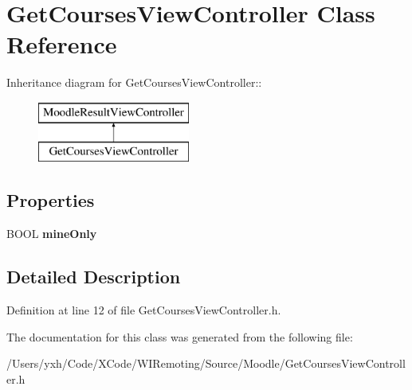 \hypertarget{interface_get_courses_view_controller}{
\section{GetCoursesViewController Class Reference}
\label{interface_get_courses_view_controller}
}
Inheritance diagram for GetCoursesViewController::\begin{figure}[H]
\begin{center}
\leavevmode
\includegraphics[height=2cm]{interface_get_courses_view_controller}
\end{center}
\end{figure}
\subsection*{Properties}
\begin{DoxyCompactItemize}
\item 
\hypertarget{interface_get_courses_view_controller_ac805e1cacc5bd96976eda41759f683ba}{
BOOL {\bfseries mineOnly}}
\label{interface_get_courses_view_controller_ac805e1cacc5bd96976eda41759f683ba}

\end{DoxyCompactItemize}


\subsection{Detailed Description}


Definition at line 12 of file GetCoursesViewController.h.

The documentation for this class was generated from the following file:\begin{DoxyCompactItemize}
\item 
/Users/yxh/Code/XCode/WIRemoting/Source/Moodle/GetCoursesViewController.h\end{DoxyCompactItemize}
